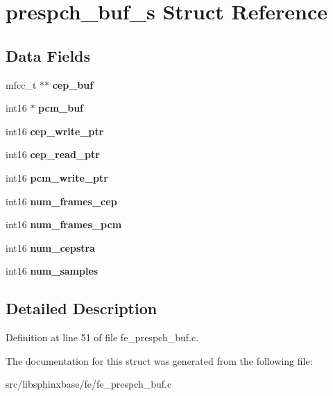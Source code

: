 \section{prespch\-\_\-buf\-\_\-s Struct Reference}
\label{structprespch__buf__s}
\subsection*{Data Fields}
\begin{DoxyCompactItemize}
\item 
mfcc\-\_\-t $\ast$$\ast$ {\bfseries cep\-\_\-buf}\label{structprespch__buf__s_a6c1208eb567b0f2a123759dfe4579256}

\item 
int16 $\ast$ {\bfseries pcm\-\_\-buf}\label{structprespch__buf__s_afc6fa1099e52f5383e4fb7f8c16e8f03}

\item 
int16 {\bfseries cep\-\_\-write\-\_\-ptr}\label{structprespch__buf__s_a339e0d13ddf808334cf0a28dd59f8e8c}

\item 
int16 {\bfseries cep\-\_\-read\-\_\-ptr}\label{structprespch__buf__s_a380d3aa29d8823a15c76055205f5d588}

\item 
int16 {\bfseries pcm\-\_\-write\-\_\-ptr}\label{structprespch__buf__s_aff9e8911f9717eed3b33eee8fab9c329}

\item 
int16 {\bfseries num\-\_\-frames\-\_\-cep}\label{structprespch__buf__s_a42b2da72f0ab5c5fa4622daa175676da}

\item 
int16 {\bfseries num\-\_\-frames\-\_\-pcm}\label{structprespch__buf__s_a3914d87504a031a083dd0c4c080b31de}

\item 
int16 {\bfseries num\-\_\-cepstra}\label{structprespch__buf__s_a8899b6abcea28de536b0abf8e6387072}

\item 
int16 {\bfseries num\-\_\-samples}\label{structprespch__buf__s_a8898e72d558042738d1ad92d2e3c7b1e}

\end{DoxyCompactItemize}


\subsection{Detailed Description}


Definition at line 51 of file fe\-\_\-prespch\-\_\-buf.\-c.



The documentation for this struct was generated from the following file\-:\begin{DoxyCompactItemize}
\item 
src/libsphinxbase/fe/fe\-\_\-prespch\-\_\-buf.\-c\end{DoxyCompactItemize}
